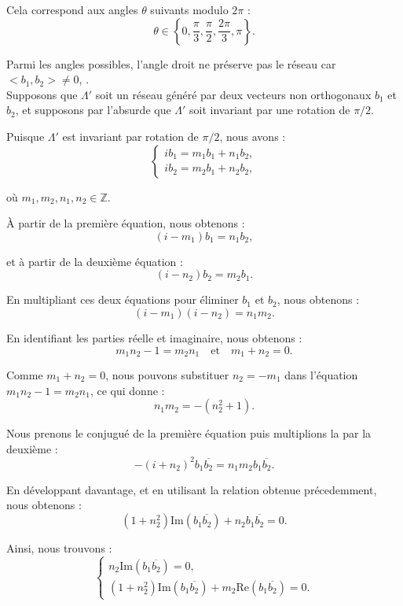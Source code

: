 Cela correspond aux angles $\theta$ suivants modulo $2 \pi$ :
\[ \theta \in \left\{ 0, \frac{\pi}{3}, \frac{\pi}{2}, \frac{2 \pi}{3}, \pi
   \right\} . \]


Parmi les angles possibles, l'angle droit ne pr{\'e}serve pas le r{\'e}seau
car $< b_1, b_2 > \neq 0$, .\\
Supposons que $\Lambda'$ soit un r{\'e}seau g{\'e}n{\'e}r{\'e} par deux
vecteurs non orthogonaux $b_1$ et $b_2$, et supposons par l'absurde que
$\Lambda'$ soit invariant par une rotation de $\pi / 2$.

Puisque $\Lambda'$ est invariant par rotation de $\pi / 2$, nous avons :
\[ \left\{\begin{array}{l}
     ib_1 = m_1 b_1 + n_1 b_2,\\
     ib_2 = m_2 b_1 + n_2 b_2,
   \end{array}\right. \]


o{\`u} $m_1, m_2, n_1, n_2 \in \mathbb{Z}$.

{\`A} partir de la premi{\`e}re {\'e}quation, nous obtenons :
\[ (i - m_1) b_1 = n_1 b_2, \]


et {\`a} partir de la deuxi{\`e}me {\'e}quation :
\[ (i - n_2) b_2 = m_2 b_1 . \]


En multipliant ces deux {\'e}quations pour {\'e}liminer $b_1$ et $b_2$, nous
obtenons :
\[ (i - m_1) (i - n_2) = n_1 m_2 . \]


En identifiant les parties r{\'e}elle et imaginaire, nous obtenons :
\[ m_1 n_2 - 1 = m_2 n_1  \quad \text{et} \quad m_1 + n_2 = 0. \]


Comme $m_1 + n_2 = 0$, nous pouvons substituer $n_2 = - m_1$ dans
l'{\'e}quation $m_1 n_2 - 1 = m_2 n_1$, ce qui donne :
\[ n_1 m_2 = - (n_2^2 + 1) . \]


Nous prenons le conjugu{\'e} de la premi{\`e}re {\'e}quation puis multiplions
la par la deuxi{\`e}me :
\[ - (i + n_2)^2 b_1 \overline{b_2} = n_1 m_2 b_1 \overline{b_2} . \]


En d{\'e}veloppant davantage, et en utilisant la relation obtenue
pr{\'e}cedemment, nous obtenons :
\[ (1 + n_2^2) \mathrm{Im} (b_1 \overline{b_2}) + n_2 b_1 \overline{b_2} = 0.
\]


Ainsi, nous trouvons :
\[ \left\{\begin{array}{l}
     n_2 \mathrm{Im} (b_1 \overline{b_2}) = 0,\\
     (1 + n_2^2) \mathrm{Im} (b_1 \overline{b_2}) + m_2 \mathrm{Re} (b_1
     \overline{b_2}) = 0.
   \end{array}\right. \]


